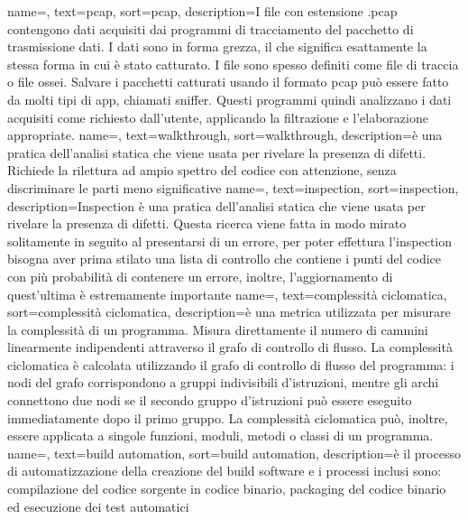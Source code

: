 {
name=,
text=pcap,
sort=pcap,
description={I file con estensione .pcap contengono dati acquisiti dai programmi di tracciamento del pacchetto di trasmissione dati.
I dati sono in forma grezza, il che significa esattamente la stessa forma in cui è stato catturato.
I file sono spesso definiti come file di traccia o file ossei.
Salvare i pacchetti catturati usando il formato pcap può essere fatto da molti tipi di app, chiamati sniffer.
Questi programmi quindi analizzano i dati acquisiti come richiesto dall'utente, applicando la filtrazione e l'elaborazione appropriate.}
}
{
name=,
text=walkthrough,
sort=walkthrough,
description={è una pratica dell’analisi statica che viene usata per rivelare la presenza di difetti.
Richiede la rilettura ad ampio spettro del codice con attenzione, senza discriminare le parti meno significative}
}
{
name=,
text=inspection,
sort=inspection,
description={Inspection è una pratica dell’analisi statica che viene usata per rivelare la presenza di difetti.
Questa ricerca viene fatta in modo mirato solitamente in seguito al presentarsi di un errore, per poter effettura l'inspection bisogna aver prima stilato una lista di controllo che contiene i punti del codice con più probabilità di contenere un errore, inoltre, l'aggiornamento di quest'ultima è estremamente importante}
}
{
name=,
text=complessità ciclomatica,
sort=complessità ciclomatica,
description={è una metrica utilizzata per misurare la complessità di un programma.
Misura direttamente il numero di cammini linearmente indipendenti attraverso il grafo di controllo di flusso.
La complessità ciclomatica è calcolata utilizzando il grafo di controllo di flusso del programma: i nodi del grafo corrispondono a gruppi indivisibili d'istruzioni, mentre gli archi connettono due nodi se il secondo gruppo d'istruzioni può essere eseguito immediatamente dopo il primo gruppo.
La complessità ciclomatica può, inoltre, essere applicata a singole funzioni, moduli, metodi o classi di un programma.\cite{site:complessita_ciclomatica} }
}
{
name=,
text=build automation,
sort=build automation,
description={è il processo di automatizzazione della creazione del build software e i processi inclusi sono: compilazione del codice sorgente in codice binario, packaging del codice binario ed esecuzione dei test automatici}
}


